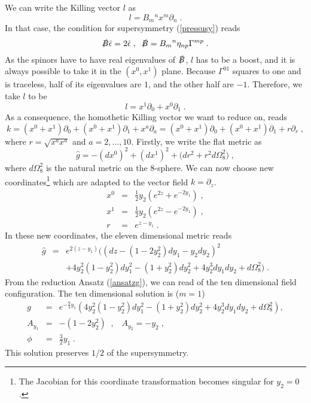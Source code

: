 \documentclass[a4paper,12pt]{article}
\newcommand{\ft}[2]{{\textstyle\frac{#1}{#2}}}
\begin{document}
We can write the Killing vector $l$ as 
\begin{equation}
l=B_m{}^n x^m \partial_n \; .
\end{equation}
In that case, the condition for supersymmetry (\ref{pressusy}) reads
\begin{equation}
\slashed{B}\hat{\epsilon}=2 \hat{\epsilon}\; , \; \; \slashed{B}=B_m{}^n \eta_{np}\Gamma^{mp}\; .
\end{equation}
As the spinors have to have real eigenvalues of $\slashed{B}$, $l$ has to be a boost, and it is always possible to take it in the $(x^0,x^1)$ plane. Because $\Gamma^{01}$ squares to one and is traceless, half of its eigenvalues are $1$, and the other half are $-1$. Therefore, we take $l$ to be 
\begin{equation}
l=x^1\partial_0+x^0\partial_1 \; .
\end{equation}
As a consequence, the homothetic Killing vector we want to reduce on, reads
\begin{equation}
k=(x^0+x^1)\partial_0+(x^0+x^1)\partial_1+x^a
\partial_a=(x^0+x^1)\partial_0+(x^0+x^1)\partial_1+r\partial_r\; ,
\end{equation}
where $r=\sqrt{x^ax^a}$ and $a=2,\dots,10$. Firstly, we write the flat metric as
\begin{equation}
\hat{g}=-(dx^0)^2+(dx^1)^2+\Big(dr^2+r^2d\Omega_8^2\Big)\; ,
\end{equation}
where $d\Omega_8^2$ is the natural metric on the 8-sphere. We can now choose new coordinates\footnote{The Jacobian for this coordinate transformation becomes singular for $y_2=0$.} which are adapted to the vector field $k=\partial_z$.
\begin{eqnarray}
x^0&=&\ft12 y_2\left( e^{2z}+e^{-2y_1} \right)\; ,\nonumber \\
x^1&=&\ft12y_2 \left( e^{2z}-e^{-2y_1} \right)\; ,\nonumber\\
r&=&e^{z-y_1}\; .
\end{eqnarray}
In these new coordinates, the eleven dimensional metric reads
\begin{eqnarray} \label{redmink}
\hat{g}&=&e^{2(z-y_1)} \Big( (dz-(1-2y_2^2)dy_1-y_2dy_2)^2\nonumber\\&&+4y_2^2(1-y_2^2)dy_1^2-(1+y_2^2)dy_2^2+4y_2^3dy_1dy_2+d\Omega_8^2 \Big)\; .
\end{eqnarray}
From the reduction Ansatz (\ref{ansatzg}), we can read of the ten dimensional field configuration. 
The ten dimensional solution is ($m=1$)
\begin{eqnarray}
g&=&e^{-\frac94y_1}\left( 4y_2^2(1-y_2^2)dy_1^2-(1+y_2^2)dy_2^2+4y_2^3dy_1dy_2+d\Omega_8^2 \right) ,\nonumber\\
A_{y_1}&=&-(1-2y_2^2) \; \;  , \; \; \;
A_{y_2}=-y_2\; ,\nonumber\\
\phi&=&\ft32 y_1\; .
\end{eqnarray}
This solution preserves $1/2$ of the supersymmetry. 
\end{document}
